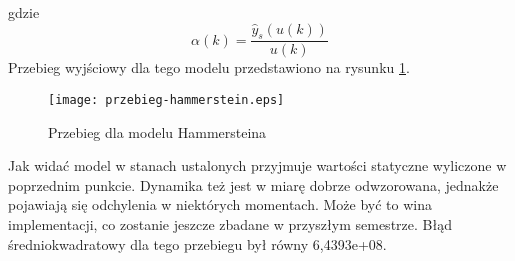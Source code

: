 gdzie
\begin{equation}
	\alpha(k) = \frac{\hat{y}_s(u(k))}{u(k)}
\end{equation}
Przebieg wyjściowy dla tego modelu przedstawiono na rysunku \ref{fig:przebieg-hammerstein}.
\begin{figure}[!h]
	\centering \texttt{[image: przebieg-hammerstein.eps]}
	\caption{Przebieg dla modelu Hammersteina}
	\label{fig:przebieg-hammerstein}
\end{figure}
Jak widać model w stanach ustalonych przyjmuje wartości statyczne wyliczone w poprzednim punkcie. Dynamika też jest w miarę dobrze odwzorowana, jednakże pojawiają się odchylenia w niektórych momentach. Może być to wina implementacji, co zostanie jeszcze zbadane w przyszłym semestrze. Błąd średniokwadratowy dla tego przebiegu był równy 6,4393e+08.